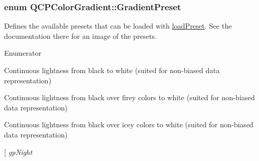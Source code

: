 \subsubsection[{Gradient\+Preset}]{\setlength{\rightskip}{0pt plus 5cm}enum {\bf Q\+C\+P\+Color\+Gradient\+::\+Gradient\+Preset}}\label{classQCPColorGradient_aed6569828fee337023670272910c9072}
Defines the available presets that can be loaded with \hyperlink{classQCPColorGradient_aa0aeec1528241728b9671bf8e60b1622}{load\+Preset}. See the documentation there for an image of the presets. \begin{Desc}
\item[Enumerator]\par
\begin{description}
\item[{\em 
\hypertarget{classQCPColorGradient_aed6569828fee337023670272910c9072add11ae369a86f3b1b6205ec72e5021fb}{}gp\+Grayscale\label{classQCPColorGradient_aed6569828fee337023670272910c9072add11ae369a86f3b1b6205ec72e5021fb}
}]Continuous lightness from black to white (suited for non-\/biased data representation) \item[{\em 
\hypertarget{classQCPColorGradient_aed6569828fee337023670272910c9072a4f42e534cf6cff5a29a5388094d099b5}{}gp\+Hot\label{classQCPColorGradient_aed6569828fee337023670272910c9072a4f42e534cf6cff5a29a5388094d099b5}
}]Continuous lightness from black over firey colors to white (suited for non-\/biased data representation) \item[{\em 
\hypertarget{classQCPColorGradient_aed6569828fee337023670272910c9072aec8c001f62c0d5cb853db5fd85309557}{}gp\+Cold\label{classQCPColorGradient_aed6569828fee337023670272910c9072aec8c001f62c0d5cb853db5fd85309557}
}]Continuous lightness from black over icey colors to white (suited for non-\/biased data representation) \item[{\em 
\hypertarget{classQCPColorGradient_aed6569828fee337023670272910c9072a1bb89351b6def7d220973443fe059c62}{}gp\+Night\label{classQCPColorGradient_aed6569828fee337023670272910c9072a1bb89351b6def7d220973443fe059c62}
}
\end{description}
\end{Desc}
